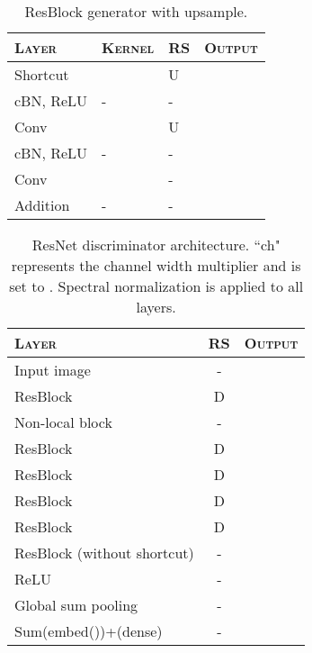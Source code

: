 \documentclass{article}
\begin{document}
\begin{table}[h]
 \centering
\caption{\label{tab:resblock_generator}ResBlock generator with upsample.\vspace{0.2cm}}
\begin{tabular}{llll}
  \toprule
      \textsc{Layer} & \textsc{Kernel}& \textsc{RS} & \textsc{Output} \\\toprule
      Shortcut &  & U &  \\ \midrule
      cBN, ReLU & - & - &  \\
      Conv &  & U &  \\
      cBN, ReLU & - & - &  \\
      Conv &  & - &  \\ \midrule
      Addition & - & - &  \\ \bottomrule
    \end{tabular}
\end{table}

\begin{table}[h]
\centering
\caption{\label{tab:resnet_d_blocks}ResNet discriminator architecture. ``ch" represents the channel width multiplier and is set to . Spectral normalization is applied to all layers. \vspace{0.2cm}}
\begin{tabular}{lcc}
\toprule
\textsc{Layer}           & \textsc{RS} & \textsc{Output} \\ \toprule
Input image &  - &             \\\midrule
ResBlock   &   D &            \\
Non-local block   &   - &            \\
ResBlock   &   D &            \\
ResBlock   &   D &            \\
ResBlock   &   D &            \\
ResBlock   &   D &            \\
ResBlock (without shortcut)   &   - &            \\
ReLU & - &        \\
Global sum pooling & - &        \\ \midrule
Sum(embed())+(dense) & - &\\ \bottomrule
\end{tabular}
\end{table}
\end{document}
